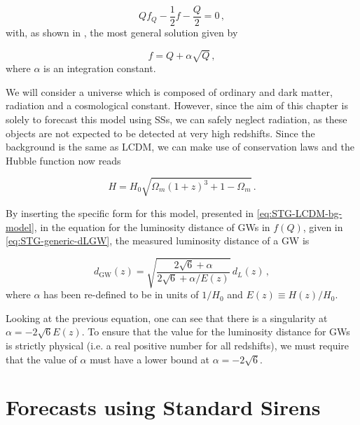 \begin{equation}
    Q f_Q - \frac{1}{2}f - \frac{Q}{2} = 0 \,,
\end{equation}
with, as shown in \cite{Jimenez2019}, the most general solution given by

\begin{equation}
    \label{eq:STG-LCDM-bg-model}
    f = Q + \alpha \sqrt{Q} \,,
\end{equation}
where $\alpha$ is an integration constant.

We will consider a universe which is composed of ordinary and dark matter, radiation and a cosmological constant. However, since the aim of this chapter is solely to forecast this model using \glspl{SS}, we can safely neglect radiation, as these objects are not expected to be detected at very high redshifts. Since the background is the same as \gls{LCDM}, we can make use of conservation laws and the Hubble function now reads

\begin{equation}
    H = H_0 \sqrt{\Omega_m (1+z)^3 + 1 - \Omega_m} \,.
\end{equation}

By inserting the specific form for this model, presented in \cref{eq:STG-LCDM-bg-model}, in the equation for the luminosity distance of \glspl{GW} in $f(Q)$, given in \cref{eq:STG-generic-dLGW}, the measured luminosity distance of a \gls{GW} is

\begin{equation}
    \label{eq:STG-LCDM-bg-dlgw}
    d_{\text{GW}}(z) = \sqrt{\frac{2\sqrt{6} + \alpha}{2\sqrt{6} + \alpha/E(z)}} \, d_L(z) \,,
\end{equation}
where $\alpha$ has been re-defined to be in units of $1/H_0$ and $E(z) \equiv H(z)/H_0$.

Looking at the previous equation, one can see that there is a singularity at $\alpha = -2\sqrt{6} E(z)$. To ensure that the value for the luminosity distance for \glspl{GW} is strictly physical (i.e. a real positive number for all redshifts), we must require that the value of $\alpha$ must have a lower bound at $\alpha = -2 \sqrt{6}$.


\section{Forecasts using Standard Sirens}
\label{sec:STG-LCDM-bg-forecasts}

